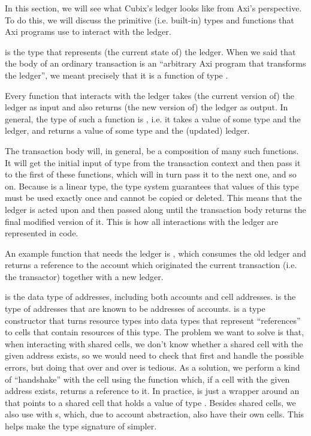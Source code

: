 In this section, we will see what Cubix's ledger looks like from Axi's perspective. To do this, we will discuss the primitive (i.e. built-in) types and functions that Axi programs use to interact with the ledger.



 is the type that represents (the current state of) the ledger. When we said that the body of an ordinary transaction is an ``arbitrary Axi program that transforms the ledger'', we meant precisely that it is a function of type .

Every function that interacts with the ledger takes (the current version of) the ledger as input and also returns (the new version of) the ledger as output. In general, the type of such a function is , i.e. it takes a value of some type  and the ledger, and returns a value of some type  and the (updated) ledger.

The transaction body will, in general, be a composition of many such functions. It will get the initial input of type  from the transaction context and then pass it to the first of these functions, which will in turn pass it to the next one, and so on. Because  is a linear type, the type system guarantees that values of this type must be used exactly once and cannot be copied or deleted. This means that the ledger is acted upon and then passed along until the transaction body returns the final modified version of it. This is how all interactions with the ledger are represented in code.



An example function that needs the ledger is , which consumes the old ledger and returns a reference to the account which originated the current transaction (i.e. the transactor) together with a new ledger.



 is the data type of addresses, including both accounts and cell addresses.  is the type of addresses that are known to be addresses of accounts.  is a type constructor that turns resource types into data types that represent ``references'' to cells that contain resources of this type. The problem we want to solve is that, when interacting with shared cells, we don't know whether a shared cell with the given address exists, so we would need to check that first and handle the possible errors, but doing that over and over is tedious. As a solution, we perform a kind of ``handshake'' with the cell using the function  which, if a cell with the given address exists, returns a reference to it. In practice,  is just a wrapper around an  that points to a shared cell that holds a value of type . Besides shared cells, we also use  with s, which, due to account abstraction, also have their own cells. This helps make the type signature of  simpler.

